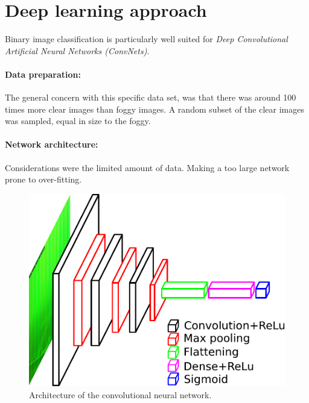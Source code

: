 \documentclass[
    ,title     = {{Methods for image classification}}
    ,longtitle
    ,highlight = dtured
    ,toplogo   = {{template/tex_dtu_compute_b_uk}}
    ,botlogo   = {{template/tex_dtu_frise}}
    ,papersize = {{a0paper}}
    ,colcount  = {{3columns}}
]{dtuposter}
\begin{document}
\begin{minipage}[t]{0.30\textwidth}







\end{minipage}\hfill
\begin{minipage}[t]{0.30\textwidth}

\section*{Deep learning approach}
Binary image classification is particularly well suited for \textit{Deep Convolutional Artificial Neural Networks (ConvNets)}.

\paragraph{Data preparation:} The general concern with this specific data set, was that there was around 100 times more clear images than foggy images. A random subset of the clear images was sampled, equal in size to the foggy.

\paragraph{Network architecture:} Considerations were the limited amount of data. Making a too large network prone to over-fitting.

\begin{figure}
    \centering
    \includegraphics[width=\textwidth]{Figures/conv_net_fig}
    \caption{Architecture of the convolutional neural network.}
\end{figure}


\end{minipage}
\end{document}
